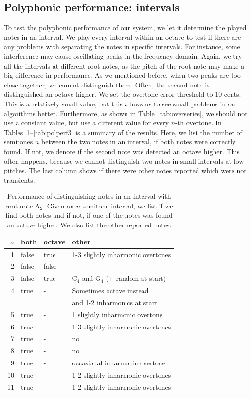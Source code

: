 \documentclass[10pt,twocolumn]{article}
\begin{document}
\subsection{Polyphonic performance: intervals}
To test the polyphonic performance of our system, we let it determine the played notes in an interval. We play every interval within an octave to test if there are any problems with separating the notes in specific intervals. For instance, some interference may cause oscillating peaks in the frequency domain. Again, we try all the intervals at different root notes, as the pitch of the root note may make a big difference in performance. As we mentioned before, when two peaks are too close together, we cannot distinguish them. Often, the second note is distinguished an octave higher. We set the overtone error threshold to 10 cents. This is a relatively small value, but this allows us to see small problems in our algorithms better. Furthermore, as shown in Table~\ref{tab:overseries}, we should not use a constant value, but use a different value for every $n$-th overtone. In Tables~\ref{tab:polperf1}--\ref{tab:polperf3} is a summary of the results. Here, we list the number of semitones $n$ between the two notes in an interval, if both notes were correctly found. If not, we denote if the second note was detected an octave higher. This often happens, because we cannot distinguish two notes in small intervals at low pitches. The last column shows if there were other notes reported which were not transients.
\begin{table}[H]%
    \centering
    \begin{tabular}{r|lll}
        $n$ & both & octave & other \\
        \hline
        1  & false & true & 1-3 slightly inharmonic overtones \\
        2  & false & false & - \\
        3  & false & true & $\text{C}_4$ and $\text{G}_4$ (+ random at start) \\
        4  & true & - & Sometimes octave instead\\ &&& and 1-2 inharmonics at start \\
        5  & true & - & 1 slightly inharmonic overtone \\
        6  & true & - & 1-3 slightly inharmonic overtones \\
        7  & true & - & no \\
        8  & true & - & no \\
        9  & true & - & occasional inharmonic overtone \\
        10 & true & - & 1-2 slightly inharmonic overtones \\
        11 & true & - & 1-2 slightly inharmonic overtones
    \end{tabular}
    \caption{Performance of distinguishing notes in an interval with root note $\text{A}_2$. Given an $n$ semitone interval, we list if we find both notes and if not, if one of the notes was found an octave higher. We also list the other reported notes.}
    \label{tab:polperf1}
\end{table}
\end{document}

